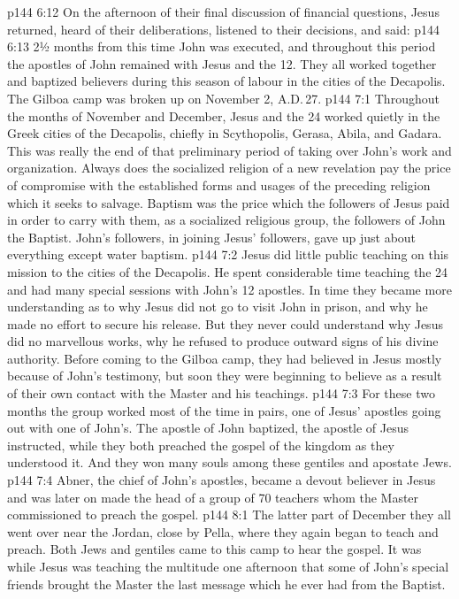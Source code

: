 \vs p144 6:12 \pc On the afternoon of their final discussion of financial questions, Jesus returned, heard of their deliberations, listened to their decisions, and said: 
\vs p144 6:13 \pc 2½ months from this time John was executed, and throughout this period the apostles of John remained with Jesus and the 12. They all worked together and baptized believers during this season of labour in the cities of the Decapolis. The Gilboa camp was broken up on November 2, A.D.\,27.
\vs p144 7:1 Throughout the months of November and December, Jesus and the 24 worked quietly in the Greek cities of the Decapolis, chiefly in Scythopolis, Gerasa, Abila, and Gadara. This was really the end of that preliminary period of taking over John’s work and organization. Always does the socialized religion of a new revelation pay the price of compromise with the established forms and usages of the preceding religion which it seeks to salvage. Baptism was the price which the followers of Jesus paid in order to carry with them, as a socialized religious group, the followers of John the Baptist. John’s followers, in joining Jesus’ followers, gave up just about everything except water baptism.
\vs p144 7:2 Jesus did little public teaching on this mission to the cities of the Decapolis. He spent considerable time teaching the 24 and had many special sessions with John’s 12 apostles. In time they became more understanding as to why Jesus did not go to visit John in prison, and why he made no effort to secure his release. But they never could understand why Jesus did no marvellous works, why he refused to produce outward signs of his divine authority. Before coming to the Gilboa camp, they had believed in Jesus mostly because of John’s testimony, but soon they were beginning to believe as a result of their own contact with the Master and his teachings.
\vs p144 7:3 For these two months the group worked most of the time in pairs, one of Jesus’ apostles going out with one of John’s. The apostle of John baptized, the apostle of Jesus instructed, while they both preached the gospel of the kingdom as they understood it. And they won many souls among these gentiles and apostate Jews.
\vs p144 7:4 Abner, the chief of John’s apostles, became a devout believer in Jesus and was later on made the head of a group of 70 teachers whom the Master commissioned to preach the gospel.
\vs p144 8:1 The latter part of December they all went over near the Jordan, close by Pella, where they again began to teach and preach. Both Jews and gentiles came to this camp to hear the gospel. It was while Jesus was teaching the multitude one afternoon that some of John’s special friends brought the Master the last message which he ever had from the Baptist.
